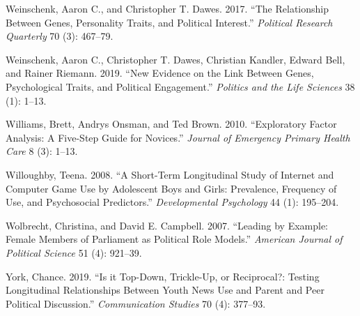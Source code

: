 \documentclass[
  letterpaper,
  DIV=11,
  numbers=noendperiod]{scrreprt}
\newlength{\cslhangindent}
\newlength{\cslentryspacingunit} %
\newenvironment{CSLReferences}[2] %
 {%
  \setlength{\parindent}{0pt}
  \ifodd #1
  \let\oldpar\par
  \def\par{\hangindent=\cslhangindent\oldpar}
  \fi
  \setlength{\parskip}{#2\cslentryspacingunit}
 }%
 {}
\begin{document}
\begin{CSLReferences}{1}{0}
\leavevmode{}%
Weinschenk, Aaron C., and Christopher T. Dawes. 2017. {``{The
Relationship Between Genes, Personality Traits, and Political
Interest}.''} \emph{Political Research Quarterly} 70 (3): 467--79.

\leavevmode{}%
Weinschenk, Aaron C., Christopher T. Dawes, Christian Kandler, Edward
Bell, and Rainer Riemann. 2019. {``{New Evidence on the Link Between
Genes, Psychological Traits, and Political Engagement}.''}
\emph{Politics and the Life Sciences} 38 (1): 1--13.

\leavevmode{}%
Williams, Brett, Andrys Onsman, and Ted Brown. 2010. {``{Exploratory
Factor Analysis: A Five-Step Guide for Novices}.''} \emph{Journal of
Emergency Primary Health Care} 8 (3): 1--13.

\leavevmode{}%
Willoughby, Teena. 2008. {``{A Short-Term Longitudinal Study of Internet
and Computer Game Use by Adolescent Boys and Girls: Prevalence,
Frequency of Use, and Psychosocial Predictors}.''} \emph{Developmental
Psychology} 44 (1): 195--204.

\leavevmode{}%
Wolbrecht, Christina, and David E. Campbell. 2007. {``{Leading by
Example: Female Members of Parliament as Political Role Models}.''}
\emph{American Journal of Political Science} 51 (4): 921--39.

\leavevmode{}%
York, Chance. 2019. {``{Is it Top-Down, Trickle-Up, or Reciprocal?:
Testing Longitudinal Relationships Between Youth News Use and Parent and
Peer Political Discussion}.''} \emph{Communication Studies} 70 (4):
377--93.

\end{CSLReferences}
\end{document}
